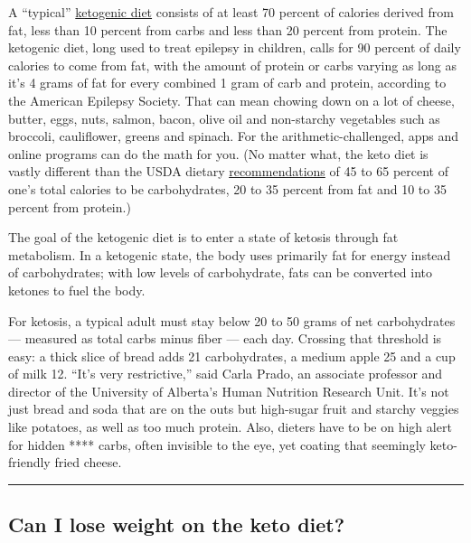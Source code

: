 A ``typical''
\href{https://www.hsph.harvard.edu/nutritionsource/healthy-weight/diet-reviews/ketogenic-diet/}{ketogenic
diet} consists of at least 70 percent of calories derived from fat, less
than 10 percent from carbs and less than 20 percent from protein. The
ketogenic diet, long used to treat epilepsy in children, calls for 90
percent of daily calories to come from fat, with the amount of protein
or carbs varying as long as it's 4 grams of fat for every combined 1
gram of carb and protein, according to the American Epilepsy Society.
That can mean chowing down on a lot of cheese, butter, eggs, nuts,
salmon, bacon, olive oil and non-starchy vegetables such as broccoli,
cauliflower, greens and spinach. For the arithmetic-challenged, apps and
online programs can do the math for you. (No matter what, the keto diet
is vastly different than the USDA dietary
\href{https://health.gov/dietaryguidelines/2015/resources/2015-2020_Dietary_Guidelines.pdf}{recommendations}
of 45 to 65 percent of one's total calories to be carbohydrates, 20 to
35 percent from fat and 10 to 35 percent from protein.)

The goal of the ketogenic diet is to enter a state of ketosis through
fat metabolism. In a ketogenic state, the body uses primarily fat for
energy instead of carbohydrates; with low levels of carbohydrate, fats
can be converted into ketones to fuel the body.

For ketosis, a typical adult must stay below 20 to 50 grams of net
carbohydrates --- measured as total carbs minus fiber --- each day.
Crossing that threshold is easy: a thick slice of bread adds 21
carbohydrates, a medium apple 25 and a cup of milk 12. ``It's very
restrictive,'' said Carla Prado, an associate professor and director of
the University of Alberta's Human Nutrition Research Unit. It's not just
bread and soda that are on the outs but high-sugar fruit and starchy
veggies like potatoes, as well as too much protein. Also, dieters have
to be on high alert for hidden **** carbs, often invisible to the eye,
yet coating that seemingly keto-friendly fried cheese.

\begin{center}\rule{0.5\linewidth}{\linethickness}\end{center}

\hypertarget{can-i-lose-weight-on-the-keto-diet}{%
\subsection{Can I lose weight on the keto
diet?}\label{can-i-lose-weight-on-the-keto-diet}}

